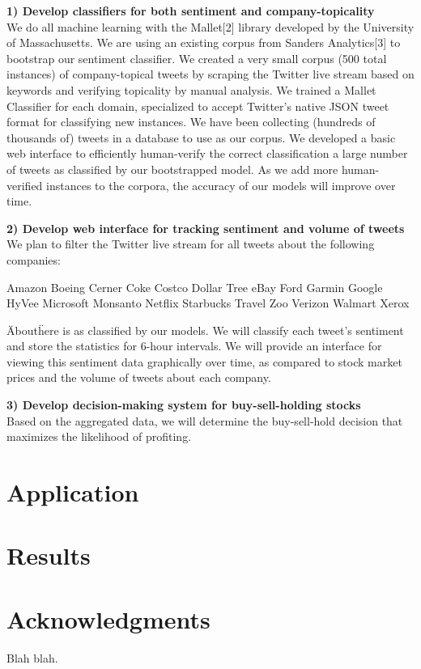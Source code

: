 \documentclass[letterpaper]{article}
\begin{document}
\textbf{1) Develop classifiers for both sentiment and company-topicality} \\
We do all machine learning with the Mallet[2] library developed by the University of Massachusetts. We are using an existing corpus from Sanders Analytics[3] to bootstrap our sentiment classifier. We created a very small corpus (500 total instances) of company-topical tweets by scraping the Twitter live stream based on keywords and verifying topicality by manual analysis. We trained a Mallet Classifier for each domain, specialized to accept Twitter's native JSON tweet format for classifying new instances. We have been collecting (hundreds of thousands of) tweets in a database to use as our corpus. We developed a basic web interface to efficiently human-verify the correct classification a large number of tweets as classified by our bootstrapped model. As we add more human-verified instances to the corpora, the accuracy of our models will improve over time.

\textbf{2) Develop web interface for tracking sentiment and volume of tweets} \\
We plan to filter the Twitter live stream for all tweets about the following companies:

Amazon Boeing Cerner Coke Costco Dollar Tree eBay Ford Garmin Google HyVee Microsoft Monsanto Netflix Starbucks Travel Zoo Verizon Walmart Xerox

\"About\" here is as classified by our models. We will classify each tweet's sentiment and store the statistics for 6-hour intervals. We will provide an interface for viewing this sentiment data graphically over time, as compared to stock market prices and the volume of tweets about each company.

\textbf{3) Develop decision-making system for buy-sell-holding stocks}\\
Based on the aggregated data, we will determine the buy-sell-hold decision that maximizes the likelihood of profiting.

\section{Application}

\section{Results}


\section{ Acknowledgments}
Blah blah.
\end{document}
